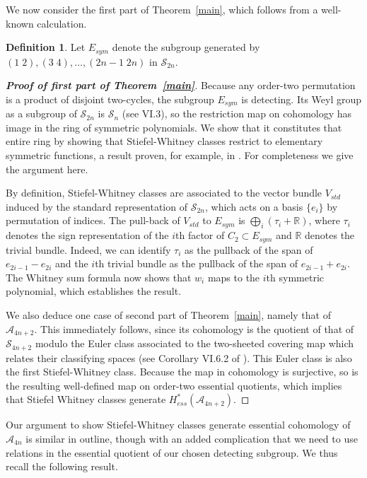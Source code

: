 \documentclass{article}
\theoremstyle{plain}
\theoremstyle{definition}
\newtheorem{definition}[theorem]{Definition}
\newcommand{\R}{\mathbb{R}}
\newcommand{\si}{\mathcal{S}}
\newcommand{\alt}{\mathcal{A}}
\begin{document}
We now consider the first part of Theorem~\ref{main}, which
follows from a well-known calculation.

\begin{definition}
    Let $E_{sym}$ denote the subgroup generated by $(1 \; 2), (3 \; 4), \ldots, (2n - 1 \; 2n)$ in $\si_{2n}$. 
\end{definition}





\begin{proof}[{\bf Proof of first part of Theorem~\ref{main}}]
Because any order-two permutation is a product of
disjoint two-cycles, the subgroup $E_{sym}$ is detecting.
Its Weyl group as a subgroup
of $\si_{2n}$ is $\si_n$ (see \cite{AdMi94} VI.3),  
so the restriction map on cohomology
has image in the ring of symmetric
polynomials.  We show that it constitutes that
entire ring by showing that Stiefel-Whitney classes
restrict to elementary symmetric functions, a result
proven, for example, in \cite{MaMi79}.  For completeness we
give the argument here.

By definition,
Stiefel-Whitney classes are associated to the vector bundle  $V_{std}$ induced by the standard representation of $\si_{2n}$, 
 which acts on a basis $\{e_i\}$
by permutation of indices. 
  The pull-back of $V_{std}$ to $E_{sym}$ is $\bigoplus_i (\tau_i + \R)$, where $\tau_i$ denotes the sign representation of the $i$th factor of $C_2 \subset E_{sym}$ 
  and $\R$ denotes the trivial bundle.  Indeed, we can identify $\tau_i$ as the pullback of the span of 
$e_{2i -1} - e_{2i}$ and the $i$th trivial bundle as the pullback of
the span of 
$e_{2i -1} + e_{2i}$.  The Whitney sum formula now shows that $w_i$ maps to the $i$th symmetric polynomial, which
establishes the result.

We also deduce one case of second part of Theorem~\ref{main},
namely that of $\alt_{4n+2}$.  This immediately follows, 
since its
cohomology is the quotient of that of
$\si_{4n+2}$ modulo the Euler class associated to the two-sheeted
covering map which relates their classifying spaces (see Corollary VI.6.2 of \cite{AdMi94}).
This Euler class is also the first Stiefel-Whitney class.
Because the map in cohomology is surjective, so is
the resulting 
well-defined map on order-two essential quotients,
which implies that Stiefel Whitney classes generate
$H^*_{ess}(\alt_{4n+2} ).$
\end{proof}

Our argument to show Stiefel-Whitney classes generate
essential cohomology of $\alt_{4n}$ is similar in outline, though with
an added complication that we need to use relations
in the essential quotient of our chosen detecting subgroup.  We thus
recall the following result.
\end{document}
